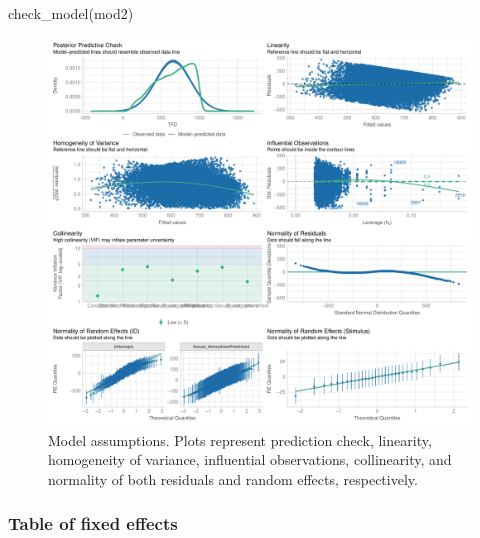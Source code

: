 \documentclass[
  bookmarksnumbered]{article}
\newenvironment{Shaded}{\begin{snugshade}}{\end{snugshade}}
\newcommand{\AttributeTok}[1]{\textcolor[rgb]{0.80,0.80,0.80}{#1}}
\newcommand{\FunctionTok}[1]{\textcolor[rgb]{0.94,0.94,0.56}{#1}}
\newcommand{\NormalTok}[1]{\textcolor[rgb]{0.80,0.80,0.80}{#1}}
\newcommand{\OtherTok}[1]{\textcolor[rgb]{0.94,0.94,0.56}{#1}}
\newcommand{\SpecialCharTok}[1]{\textcolor[rgb]{0.86,0.64,0.64}{#1}}
\begin{document}
\begin{Shaded}
\begin{Highlighting}[]
\FunctionTok{check\_model}\NormalTok{(mod2)}
\end{Highlighting}
\end{Shaded}

\begin{figure}
\centering
\includegraphics{Supplementary_material_files/figure-latex/assu-mod2-1.pdf}
\caption{\label{fig:assu-mod2}Model assumptions. Plots represent prediction check, linearity, homogeneity of variance, influential observations, collinearity, and normality of both residuals and random effects, respectively.}
\end{figure}

\subsubsection{Table of fixed effects}\label{table-of-fixed-effects-1}

\begin{Shaded}
\end{Shaded}
\end{document}
